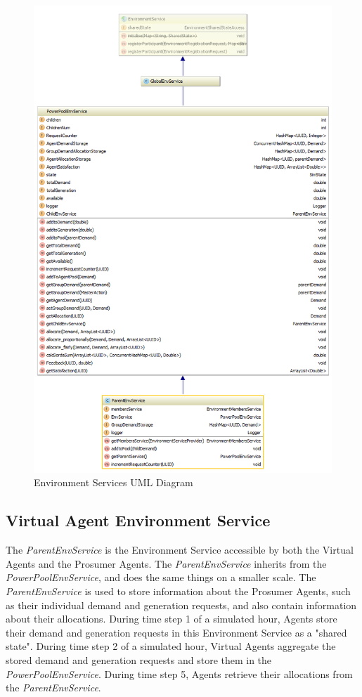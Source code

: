 \begin{figure}[!h]
	\centering
	\includegraphics[scale=0.5]{Images/EnvironmentUML-2.png}
	\caption{Environment Services UML Diagram}
	\label{fig:ServiceUML2}
\end{figure}

\subsection*{Virtual Agent Environment Service}
The \textit{ParentEnvService} is the Environment Service accessible by both the Virtual Agents and the Prosumer Agents. The \textit{ParentEnvService} inherits from the \textit{PowerPoolEnvService}, and does the same things on a smaller scale. The \textit{ParentEnvService} is used to store information about the Prosumer Agents, such as their individual demand and generation requests, and also contain information about their allocations. During time step 1 of a simulated hour, Agents store their demand and generation requests in this Environment Service as a "shared state". During time step 2 of a simulated hour, Virtual Agents aggregate the stored demand and generation requests and store them in the \textit{PowerPoolEnvService}. During time step 5, Agents retrieve their allocations from the \textit{ParentEnvService}.

